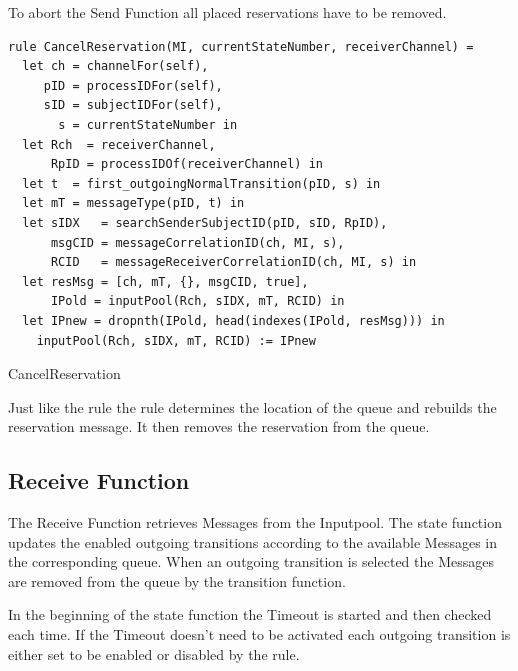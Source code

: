To abort the Send Function all placed reservations have to be removed.


\begin{listing}[htbp]
\begin{verbatim}
rule CancelReservation(MI, currentStateNumber, receiverChannel) =
  let ch = channelFor(self),
     pID = processIDFor(self),
     sID = subjectIDFor(self),
       s = currentStateNumber in
  let Rch  = receiverChannel,
      RpID = processIDOf(receiverChannel) in
  let t  = first_outgoingNormalTransition(pID, s) in
  let mT = messageType(pID, t) in
  let sIDX   = searchSenderSubjectID(pID, sID, RpID),
      msgCID = messageCorrelationID(ch, MI, s),
      RCID   = messageReceiverCorrelationID(ch, MI, s) in
  let resMsg = [ch, mT, {}, msgCID, true],
      IPold = inputPool(Rch, sIDX, mT, RCID) in
  let IPnew = dropnth(IPold, head(indexes(IPold, resMsg))) in
    inputPool(Rch, sIDX, mT, RCID) := IPnew
\end{verbatim}
\caption{CancelReservation}
\label{lst:shortasm:CancelReservation}
\end{listing}


Just like the  rule the
 rule determines the location of the queue and
rebuilds the reservation message. It then removes the reservation from the
queue.


\subsection{Receive Function}


The Receive Function retrieves Messages from the Inputpool. The state function
updates the enabled outgoing transitions according to the available Messages in
the corresponding queue. When an outgoing transition is selected the Messages
are removed from the queue by the transition function.


In the beginning of the state function the Timeout is started and then checked
each time.
If the Timeout doesn't need to be activated each outgoing transition is either set to
be enabled or disabled by the  rule.


